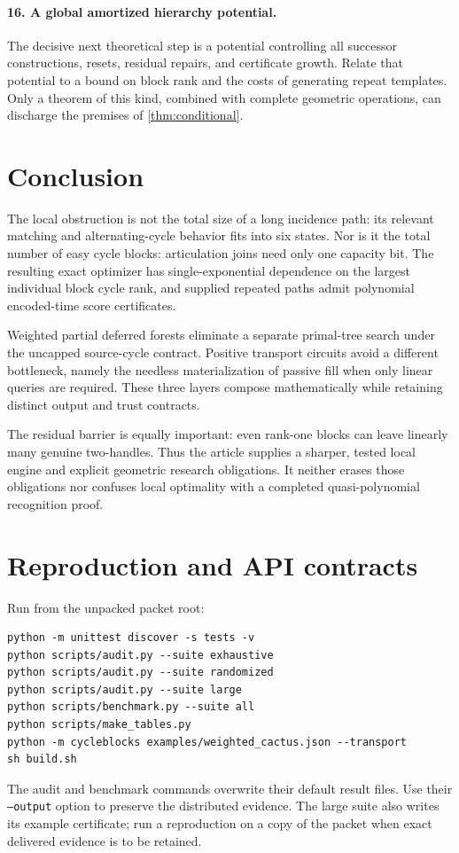 \documentclass[11pt,letterpaper]{article}
\theoremstyle{definition}
\theoremstyle{remark}
\newcommand{\code}[1]{\texttt{\small #1}}
\begin{document}
\paragraph{16. A global amortized hierarchy potential.}
The decisive next theoretical step is a potential controlling all successor constructions, resets, residual repairs, and certificate growth. Relate that potential to a bound on block rank and the costs of generating repeat templates. Only a theorem of this kind, combined with complete geometric operations, can discharge the premises of \cref{thm:conditional}.

\section{Conclusion}
The local obstruction is not the total size of a long incidence path: its relevant matching and alternating-cycle behavior fits into six states. Nor is it the total number of easy cycle blocks: articulation joins need only one capacity bit. The resulting exact optimizer has single-exponential dependence on the largest individual block cycle rank, and supplied repeated paths admit polynomial encoded-time score certificates.

Weighted partial deferred forests eliminate a separate primal-tree search under the uncapped source-cycle contract. Positive transport circuits avoid a different bottleneck, namely the needless materialization of passive fill when only linear queries are required. These three layers compose mathematically while retaining distinct output and trust contracts.

The residual barrier is equally important: even rank-one blocks can leave linearly many genuine two-handles. Thus the article supplies a sharper, tested local engine and explicit geometric research obligations. It neither erases those obligations nor confuses local optimality with a completed quasi-polynomial recognition proof.

\appendix
\section{Reproduction and API contracts}
\label{sec:reproduce}
Run from the unpacked packet root:
\begin{verbatim}
python -m unittest discover -s tests -v
python scripts/audit.py --suite exhaustive
python scripts/audit.py --suite randomized
python scripts/audit.py --suite large
python scripts/benchmark.py --suite all
python scripts/make_tables.py
python -m cycleblocks examples/weighted_cactus.json --transport
sh build.sh
\end{verbatim}
The audit and benchmark commands overwrite their default result files. Use their \code{--output} option to preserve the distributed evidence. The large suite also writes its example certificate; run a reproduction on a copy of the packet when exact delivered evidence is to be retained.
\end{document}
